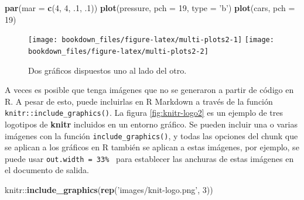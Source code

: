 \documentclass[12pt,]{krantz}
\makeatletter
\newenvironment{Shaded}{\begin{snugshade}}{\end{snugshade}}
\newcommand{\KeywordTok}[1]{\textcolor[rgb]{0.13,0.29,0.53}{\textbf{{#1}}}}
\newcommand{\DataTypeTok}[1]{\textcolor[rgb]{0.13,0.29,0.53}{{#1}}}
\newcommand{\DecValTok}[1]{\textcolor[rgb]{0.00,0.00,0.81}{{#1}}}
\newcommand{\StringTok}[1]{\textcolor[rgb]{0.31,0.60,0.02}{{#1}}}
\newcommand{\NormalTok}[1]{{#1}}
\newenvironment{kframe}{%
\medskip{}
\setlength{\fboxsep}{.8em}
 \def\at@end@of@kframe{}%
 \ifinner\ifhmode%
  \def\at@end@of@kframe{\end{minipage}}%
  \begin{minipage}{\columnwidth}%
 \fi\fi%
 \def\FrameCommand##1{\hskip\@totalleftmargin \hskip-\fboxsep
 \colorbox{shadecolor}{##1}\hskip-\fboxsep
     \hskip-\linewidth \hskip-\@totalleftmargin \hskip\columnwidth}%
 \MakeFramed {\advance\hsize-\width
   \@totalleftmargin\z@ \linewidth\hsize
   \@setminipage}}%
 {\par\unskip\endMakeFramed%
 \at@end@of@kframe}
\renewenvironment{Shaded}{\begin{kframe}}{\end{kframe}}
\theoremstyle{definition}
\theoremstyle{definition}
\theoremstyle{remark}
\makeatother
\begin{document}
\begin{Shaded}
\begin{Highlighting}[]
\KeywordTok{par}\NormalTok{(}\DataTypeTok{mar =} \KeywordTok{c}\NormalTok{(}\DecValTok{4}\NormalTok{, }\DecValTok{4}\NormalTok{, .}\DecValTok{1}\NormalTok{, .}\DecValTok{1}\NormalTok{))}
\KeywordTok{plot}\NormalTok{(pressure, }\DataTypeTok{pch =} \DecValTok{19}\NormalTok{, }\DataTypeTok{type =} \StringTok{'b'}\NormalTok{)}
\KeywordTok{plot}\NormalTok{(cars, }\DataTypeTok{pch =} \DecValTok{19}\NormalTok{)}
\end{Highlighting}
\end{Shaded}

\begin{figure}
\texttt{[image: bookdown\_files/figure-latex/multi-plots2-1]} \texttt{[image: bookdown\_files/figure-latex/multi-plots2-2]} \caption{Dos gráficos dispuestos uno al lado del otro.}\label{fig:multi-plots2}
\end{figure}

A veces es posible que tenga imágenes que no se generaron a partir de
código en R. A pesar de esto, puede incluirlas en R Markdown a través de
la función \texttt{knitr::include\_graphics()}. La figura
\ref{fig:knitr-logo2} es un ejemplo de tres logotipos de \textbf{knitr}
incluidos en un entorno gráfico. Se pueden incluir una o varias imágenes
con la función \texttt{include\_graphics()}, y todas las opciones del
chunk que se aplican a los gráficos en R también se aplican a estas
imágenes, por ejemplo, se puede usar
\texttt{out.width\ =\ \textquotesingle{}33\%\ \textquotesingle{}} para
establecer las anchuras de estas imágenes en el documento de salida.

\begin{Shaded}
\begin{Highlighting}[]
\NormalTok{knitr::}\KeywordTok{include_graphics}\NormalTok{(}\KeywordTok{rep}\NormalTok{(}\StringTok{'images/knit-logo.png'}\NormalTok{, }\DecValTok{3}\NormalTok{))}
\end{Highlighting}
\end{Shaded}
\end{document}
